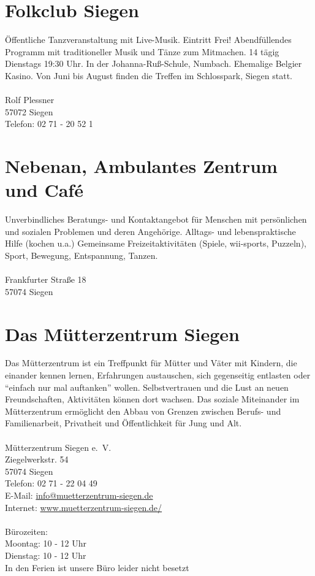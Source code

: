 \section{Folkclub Siegen} 
Öffentliche Tanzveranstaltung mit Live-Musik. Eintritt Frei! Abendfüllendes Programm mit traditioneller Musik und Tänze zum Mitmachen. 14 tägig Dienstags 19:30 Uhr. In der Johanna-Ruß-Schule, Numbach. Ehemalige Belgier Kasino. Von Juni bis August finden die Treffen im Schlosspark, Siegen statt. \\
\\
Rolf Plessner\\
57072 Siegen\\
Telefon: 02 71 - 20 52 1 

\section{Nebenan, Ambulantes Zentrum und Café }
Unverbindliches Beratungs- und Kontaktangebot für Menschen mit persönlichen und sozialen Problemen und deren Angehörige. Alltags- und lebenspraktische Hilfe (kochen u.a.) Gemeinsame Freizeitaktivitäten (Spiele, wii-sports, Puzzeln), Sport, Bewegung, Entspannung, Tanzen.\\
\\
Frankfurter Straße 18\\
57074 Siegen

\section{Das Mütterzentrum Siegen}
Das Mütterzentrum ist ein Treffpunkt für Mütter und Väter mit Kindern, die einander kennen lernen, Erfahrungen austauschen, sich gegenseitig entlasten oder \enquote{einfach nur mal auftanken} wollen. Selbstvertrauen und die Lust an neuen Freundschaften, Aktivitäten können dort wachsen. Das soziale Miteinander im Mütterzentrum ermöglicht den Abbau von Grenzen zwischen Berufs- und  Familienarbeit, Privatheit und Öffentlichkeit für Jung und Alt.\\
\\
Mütterzentrum Siegen e.~V.\\
Ziegelwerkstr. 54\\
57074 Siegen\\
Telefon: 02 71 - 22 04 49\\
E-Mail: \href{info@muetterzentrum-siegen.de}{info@muetterzentrum-siegen.de} \\
Internet: \href{http://www.muetterzentrum-siegen.de/}{www.muetterzentrum-siegen.de/}\\
\\
Bürozeiten: \\
Moontag: 10 - 12 Uhr\\
Dienstag: 10 - 12 Uhr\\
In den Ferien ist unsere Büro leider nicht besetzt